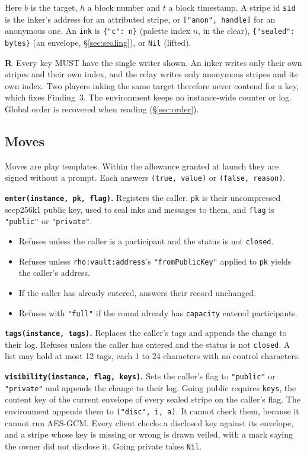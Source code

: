 \documentclass[11pt,a4paper]{article}
\newcommand{\code}[1]{\texttt{#1}}
\newcommand{\MUST}{{\fontsize{0.82em}{1em}\selectfont MUST}}
\newcounter{req}
\newcommand{\req}[1]{\refstepcounter{req}\label{#1}\textbf{R\thereq}}
\begin{document}
Here $b$ is the target, $h$ a block number and $t$ a block timestamp. A stripe id \code{sid} is
the inker's address for an attributed stripe, or \code{["anon", handle]} for an anonymous one. An
\code{ink} is \code{\{"c": n\}} (palette index $n$, in the clear), \code{\{"sealed": bytes\}}
(an envelope, \S\ref{sec:sealing}), or \code{Nil} (lifted).

\req{r:single-writer}~Every key \MUST{} have the single writer shown. An inker writes only their
own stripes and their own index, and the relay writes only anonymous stripes and its own index.
Two players inking the same target therefore never contend for a key, which fixes Finding~3. The
environment keeps no instance-wide counter or log. Global order is recovered when reading
(\S\ref{sec:order}).

\subsection{Moves}\label{sec:moves}

Moves are play templates. Within the allowance granted at launch they are signed without a
prompt. Each answers \code{(true, value)} or \code{(false, reason)}.

\textbf{\code{enter(instance, pk, flag)}.} Registers the caller. \code{pk} is their
uncompressed secp256k1 public key, used to seal inks and messages to them, and \code{flag} is
\code{"public"} or \code{"private"}.
\begin{itemize}[leftmargin=1.2em,itemsep=1pt]
\item Refuses unless the caller is a participant and the status is not \code{closed}.
\item Refuses unless \code{rho:vault:address}'s \code{"fromPublicKey"} applied to \code{pk}
  yields the caller's address.
\item If the caller has already entered, answers their record unchanged.
\item Refuses with \code{"full"} if the round already has \code{capacity} entered participants.
\end{itemize}

\textbf{\code{tags(instance, tags)}.} Replaces the caller's tags and appends the change to their
log. Refuses unless the caller has entered and the status is not \code{closed}. A list may hold
at most 12 tags, each 1 to 24 characters with no control characters.

\textbf{\code{visibility(instance, flag, keys)}.} Sets the caller's flag to \code{"public"} or
\code{"private"} and appends the change to their log. Going public requires \code{keys}, the
content key of the current envelope of every sealed stripe on the caller's flag. The
environment appends them to \code{("disc", i, a)}. It cannot check them, because it cannot run
AES-GCM. Every client checks a disclosed key against its envelope, and a stripe whose key is
missing or wrong is drawn veiled, with a mark saying the owner did not disclose it. Going private
takes \code{Nil}.
\end{document}
